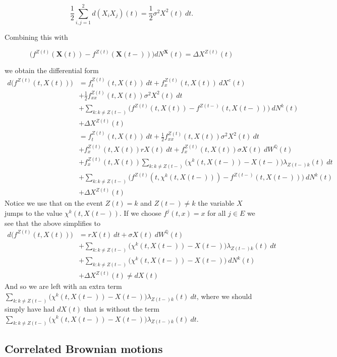 \documentclass[
]{book}
\begin{document}
\[
\frac{1}{2}\sum_{i,j=1}^2d(X_iX_j)(t)=\frac{1}{2}\sigma^2X^2(t)\ dt.
\]

Combining this with

\[
\Big(f^{Z(t)}(\mathbf X(t))-f^{Z(t)}(\mathbf X(t-))\Big)dN^\mathbf X(t)=\Delta X^{Z(t)}(t)
\]

we obtain the differential form
\begin{align*}
d \Big(f^{Z(t)}(t,X(t))\Big)&=f_t^{Z(t)}(t,X(t))\ dt+f_x^{Z(t)}(t,X(t))\ dX^c(t)\\
&+\frac{1}{2}f^{Z(t)}_{xx}(t,X(t))\sigma^2X^2(t)\ dt\\
&+\sum_{k:k\ne Z(t-)}\Big(f^{Z(t)}(t,X(t))-f^{Z(t-)}(t,X(t-))\Big)\ dN^k(t)\\
&+\Delta X^{Z(t)}(t)\\
&=f_t^{Z(t)}(t,X(t))\ dt+\frac{1}{2}f^{Z(t)}_{xx}(t,X(t))\sigma^2X^2(t)\ dt\\
&+f_x^{Z(t)}(t,X(t))rX(t)\ dt+f_x^{Z(t)}(t,X(t))\sigma X(t)\ dW^\mathbb Q(t)\\
&+f_x^{Z(t)}(t,X(t))\sum_{k:k\ne Z(t-)}\Big(\chi^k(t,X(t-))-X(t-)\Big)\lambda_{Z(t-)k}(t)\ dt\\
&+\sum_{k:k\ne Z(t-)}\Big(f^{Z(t)}(t,\chi^k(t,X(t-)))-f^{Z(t-)}(t,X(t-))\Big)\ dN^k(t)\\
&+\Delta X^{Z(t)}(t)
\end{align*}
Notice we use that on the event \(Z(t)=k\) and \(Z(t-)\ne k\) the variable \(X\) jumps to the value \(\chi^k(t,X(t-))\). If we choose \(f^j(t,x)=x\) for all \(j\in E\) we see that the above simplifies to
\begin{align*}
d \Big(f^{Z(t)}(t,X(t))\Big)&=rX(t)\ dt+\sigma X(t)\ dW^\mathbb Q(t)\\
&+\sum_{k:k\ne Z(t-)}\Big(\chi^k(t,X(t-))-X(t-)\Big)\lambda_{Z(t-)k}(t)\ dt\\
&+\sum_{k:k\ne Z(t-)}\Big(\chi^k(t,X(t-))-X(t-))\ dN^k(t)\\
&+\Delta X^{Z(t)}(t)\ne dX(t)
\end{align*}
And so we are left with an extra term \(\sum_{k:k\ne Z(t-)}\Big(\chi^k(t,X(t-))-X(t-)\Big)\lambda_{Z(t-)k}(t)\ dt\), where we should simply have had \(dX(t)\) that is without the term \(\sum_{k:k\ne Z(t-)}\Big(\chi^k(t,X(t-))-X(t-)\Big)\lambda_{Z(t-)k}(t)\ dt\).
\pagebreak

\hypertarget{correlated-brownian-motions}{%
\subsection{Correlated Brownian motions}\label{correlated-brownian-motions}}
\end{document}
